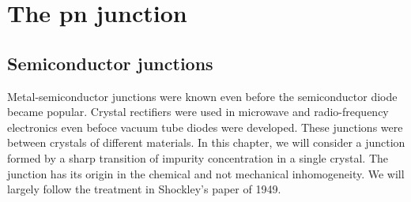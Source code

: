 \chapter{The pn junction}\label{c2}
\section{Semiconductor junctions}\label{c2s1}
Metal-semiconductor junctions were known even before the semiconductor diode
became popular. Crystal rectifiers were used in microwave and radio-frequency
electronics even befoce vacuum tube diodes were developed. These junctions were
between crystals of different materials. In this chapter, we will consider a
junction formed by a sharp transition of impurity concentration in a single
crystal. The junction has its origin in the chemical and not mechanical 
inhomogeneity. We will largely follow the treatment in Shockley's 
\cite{shockley1949theory} paper of 1949.

